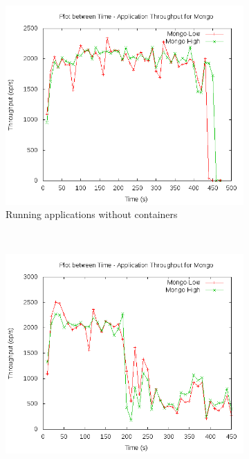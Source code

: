 	\pagebreak
	
	\begin{figure}[t!]
	  \centering
	  \begin{subfigure}[t]{0.48\textwidth}
	    \centering
	    \includegraphics[width=1\textwidth]{images/intro/native.png}
	    \caption{Running applications without containers}
	    \label{plot_intro_native}
	  \end{subfigure}
	  ~ 
	  \begin{subfigure}[t]{0.48\textwidth}
	    \centering
	    \includegraphics[width=1\textwidth]{images/intro/observed.png}

\end{subfigure}
\end{figure}

